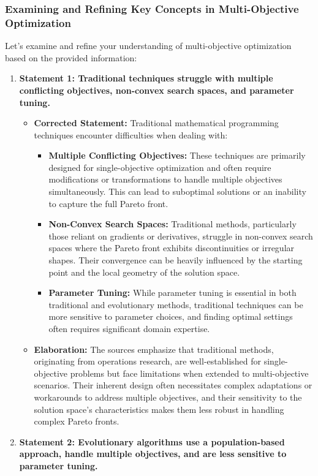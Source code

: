 \documentclass[
]{article}
\author{}
\date{}
\begin{document}
\subsubsection{Examining and Refining Key Concepts in Multi-Objective
Optimization}\label{examining-and-refining-key-concepts-in-multi-objective-optimization}

Let's examine and refine your understanding of multi-objective
optimization based on the provided information:

\begin{enumerate}
\def\labelenumi{\arabic{enumi}.}
\item
  \textbf{Statement 1: Traditional techniques struggle with multiple
  conflicting objectives, non-convex search spaces, and parameter
  tuning.}

  \begin{itemize}
  
  \item
    \textbf{Corrected Statement:} Traditional mathematical programming
    techniques encounter difficulties when dealing with:

    \begin{itemize}
    
    \item
      \textbf{Multiple Conflicting Objectives:} These techniques are
      primarily designed for single-objective optimization and often
      require modifications or transformations to handle multiple
      objectives simultaneously. This can lead to suboptimal solutions
      or an inability to capture the full Pareto front.
    \item
      \textbf{Non-Convex Search Spaces:} Traditional methods,
      particularly those reliant on gradients or derivatives, struggle
      in non-convex search spaces where the Pareto front exhibits
      discontinuities or irregular shapes. Their convergence can be
      heavily influenced by the starting point and the local geometry of
      the solution space.
    \item
      \textbf{Parameter Tuning:} While parameter tuning is essential in
      both traditional and evolutionary methods, traditional techniques
      can be more sensitive to parameter choices, and finding optimal
      settings often requires significant domain expertise.
    \end{itemize}
  \item
    \textbf{Elaboration:} The sources emphasize that traditional
    methods, originating from operations research, are well-established
    for single-objective problems but face limitations when extended to
    multi-objective scenarios. Their inherent design often necessitates
    complex adaptations or workarounds to address multiple objectives,
    and their sensitivity to the solution space's characteristics makes
    them less robust in handling complex Pareto fronts.
  \end{itemize}
\item
  \textbf{Statement 2: Evolutionary algorithms use a population-based
  approach, handle multiple objectives, and are less sensitive to
  parameter tuning.}


\end{enumerate}
\end{document}
